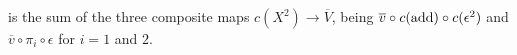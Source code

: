 \documentclass[11pt]{amsart}
\theoremstyle{plain}
\theoremstyle{definition}
\renewcommand{\to}{\longrightarrow}
\theoremstyle{plain}
\begin{document}
\begin{Operations on the Bousfield-Kan spectral sequence}
is the sum of the three composite maps $c(X^2)\to \overline{V}$, being $\overline{v}\circ c(\textup{add})\circ c(\epsilon^2)$ and $\overline{v}\circ\pi_i\circ\epsilon$ for $i=1$ and $2$.
%

\end{Operations on the Bousfield-Kan spectral sequence}
\end{document}
